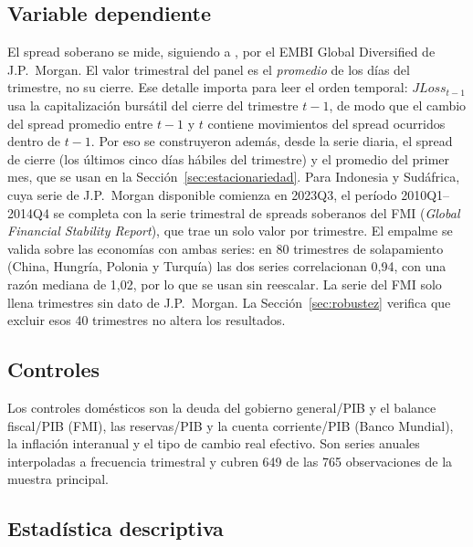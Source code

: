 \subsection{Variable dependiente}

El spread soberano se mide, siguiendo a \citet{Chari2024b}, por el EMBI Global Diversified de J.P.\ Morgan. El valor trimestral del panel es el \emph{promedio} de los días del trimestre, no su cierre. Ese detalle importa para leer el orden temporal: $JLoss_{t-1}$ usa la capitalización bursátil del cierre del trimestre $t-1$, de modo que el cambio del spread promedio entre $t-1$ y $t$ contiene movimientos del spread ocurridos dentro de $t-1$. Por eso se construyeron además, desde la serie diaria, el spread de cierre (los últimos cinco días hábiles del trimestre) y el promedio del primer mes, que se usan en la Sección~\ref{sec:estacionariedad}. Para Indonesia y Sudáfrica, cuya serie de J.P.\ Morgan disponible comienza en 2023Q3, el período 2010Q1--2014Q4 se completa con la serie trimestral de spreads soberanos del FMI (\textit{Global Financial Stability Report}), que trae un solo valor por trimestre. El empalme se valida sobre las economías con ambas series: en 80 trimestres de solapamiento (China, Hungría, Polonia y Turquía) las dos series correlacionan 0,94, con una razón mediana de 1,02, por lo que se usan sin reescalar. La serie del FMI solo llena trimestres sin dato de J.P.\ Morgan. La Sección~\ref{sec:robustez} verifica que excluir esos 40 trimestres no altera los resultados.

\subsection{Controles}

Los controles domésticos son la deuda del gobierno general/PIB y el balance fiscal/PIB (FMI), las reservas/PIB y la cuenta corriente/PIB (Banco Mundial), la inflación interanual y el tipo de cambio real efectivo. Son series anuales interpoladas a frecuencia trimestral y cubren 649 de las 765 observaciones de la muestra principal.

\subsection{Estadística descriptiva}

